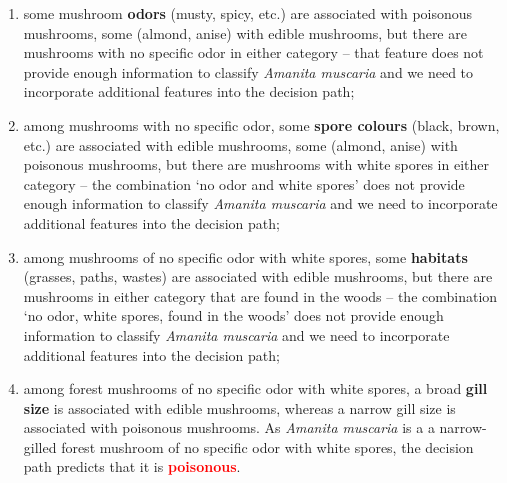 \begin{enumerate}[noitemsep]
    \item some mushroom \textbf{odors} (musty, spicy, etc.) are associated with poisonous mushrooms, some (almond, anise) with edible mushrooms, but there are  mushrooms with no specific odor in either category -- that feature does not provide enough information to classify \textit{Amanita muscaria} and we need to incorporate additional features into the decision path;
    \item among mushrooms with no specific odor, some \textbf{spore colours} (black, brown, etc.) are associated with edible mushrooms, some (almond, anise) with poisonous mushrooms, but there are  mushrooms with white spores in either category -- the combination `no odor and white spores' does not provide enough information to classify \textit{Amanita muscaria} and we need to incorporate additional features into the decision path;
    \item among mushrooms of no specific odor with white spores, some \textbf{habitats} (grasses, paths, wastes) are associated with edible mushrooms, but there are  mushrooms in either category that are found in the woods -- the combination `no odor, white spores, found in the woods' does not provide enough information to classify \textit{Amanita muscaria} and we need to incorporate additional features into the decision path;
    \item among forest mushrooms of no specific odor with white spores, a broad \textbf{gill size} is associated with edible mushrooms, whereas a narrow gill size is associated with poisonous mushrooms. As \textit{Amanita muscaria} is a a narrow-gilled forest mushroom of no specific odor with white spores, the decision path predicts that it is \textbf{\textcolor{Red}{poisonous}}. 
\end{enumerate}   
